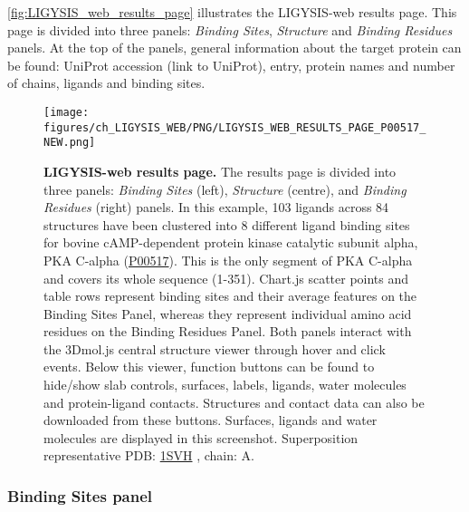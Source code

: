 \autoref{fig:LIGYSIS_web_results_page} illustrates the LIGYSIS-web results page. This page is divided into three panels: \textit{Binding Sites}, \textit{Structure} and \textit{Binding Residues} panels. At the top of the panels, general information about the target protein can be found: UniProt accession (link to UniProt), entry, protein names and number of chains, ligands and binding sites.

\begin{landscape}
\begin{figure}[htb!]
    \centering
    \texttt{[image: figures/ch\_LIGYSIS\_WEB/PNG/LIGYSIS\_WEB\_RESULTS\_PAGE\_P00517\_NEW.png]}
    \caption[LIGYSIS-web results page]{\textbf{LIGYSIS-web results page.} The results page is divided into three panels: \textit{Binding Sites} (left), \textit{Structure} (centre), and \textit{Binding Residues} (right) panels. In this example, 103 ligands across 84 structures have been clustered into 8 different ligand binding sites for bovine cAMP-dependent protein kinase catalytic subunit alpha, PKA C-alpha (\href{https://www.uniprot.org/uniprotkb/P00517/entry}{P00517}). This is the only segment of PKA C-alpha and covers its whole sequence (1-351). Chart.js scatter points and table rows represent binding sites and their average features on the Binding Sites Panel, whereas they represent individual amino acid residues on the Binding Residues Panel. Both panels interact with the 3Dmol.js central structure viewer through hover and click events. Below this viewer, function buttons can be found to hide/show slab controls, surfaces, labels, ligands, water molecules and protein-ligand contacts. Structures and contact data can also be downloaded from these buttons. Surfaces, ligands and water molecules are displayed in this screenshot. Superposition representative PDB: \href{https://www.ebi.ac.uk/pdbe/entry/pdb/1svh}{1SVH} \cite{BREITENLECHNER_2004_PKB}, chain: A.}
    \label{fig:LIGYSIS_web_results_page}
\end{figure}
\end{landscape}

\subsubsection{Binding Sites panel}

